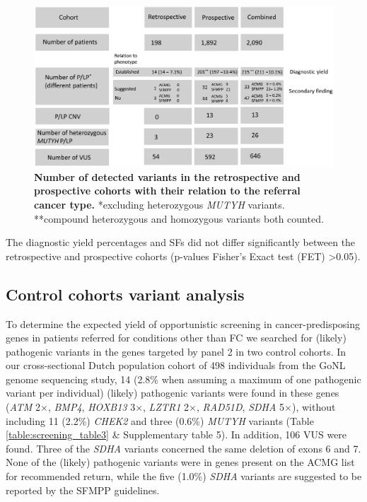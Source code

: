 \begin{figure}
	\includegraphics[width=1.0\linewidth]{img/opportunistic_screening_Fig1}
	\caption[Number of detected variants in the cohorts]{\textbf{Number of detected variants in the retrospective and prospective cohorts with their relation to the referral cancer type.} \footnotesize{*excluding heterozygous \textsl{MUTYH} variants. **compound heterozygous and homozygous variants both counted.}
	}
	\label{fig:screening_Fig1}
\end{figure}


The diagnostic yield percentages and SFs did not differ significantly between the retrospective and prospective cohorts (p-values Fisher’s Exact test (FET) \textgreater0.05).

\subsection{Control cohorts variant analysis}
To determine the expected yield of opportunistic screening in cancer-predisposing genes in patients referred for conditions other than FC we searched for (likely) pathogenic variants in the genes targeted by panel 2 in two control cohorts. 
In our cross-sectional Dutch population cohort of 498 individuals from the GoNL genome sequencing study, 14 (2.8\% when assuming a maximum of one pathogenic variant per individual) (likely) pathogenic variants were found in these genes (\textsl{ATM} 2$\times$, \textsl{BMP4}, \textsl{HOXB13} 3$\times$, \textsl{LZTR1} 2$\times$, \textsl{RAD51D}, \textsl{SDHA} 5$\times$), without including 11 (2.2\%) \textsl{CHEK2} and three (0.6\%) \textsl{MUTYH} variants (Table \ref{table:screening_table3} \& Supplementary table 5). %
In addition, 106 VUS were found. Three of the \textsl{SDHA} variants concerned the same deletion of exons 6 and 7. 
None of the (likely) pathogenic variants were in genes present on the ACMG list for recommended return, while the five (1.0\%) \textsl{SDHA} variants are suggested to be reported by the SFMPP guidelines.

